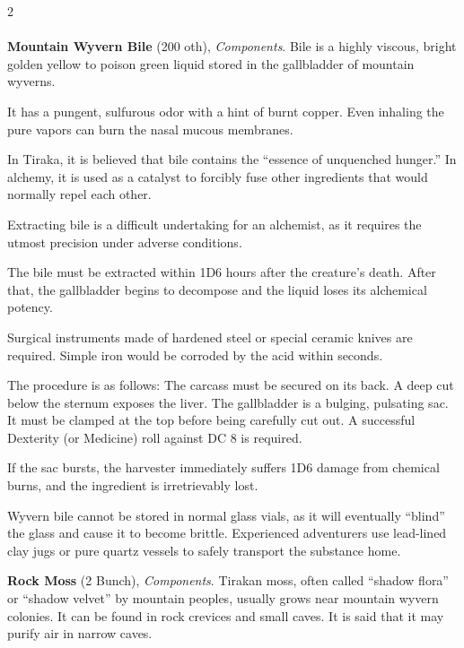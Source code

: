 \begin{multicols}{2}
    \paragraph{}
    \begin{denseitemize}
        \item \textbf{Mountain Wyvern Bile} (200 oth), \textit{Components}.
        Bile is a highly viscous, bright golden yellow to poison green liquid stored in the gallbladder of mountain wyverns.

It has a pungent, sulfurous odor with a hint of burnt copper. Even inhaling the pure vapors can burn the nasal mucous membranes.

In Tiraka, it is believed that bile contains the “essence of unquenched hunger.” In alchemy, it is used as a catalyst to forcibly fuse other ingredients that would normally repel each other.

Extracting bile is a difficult undertaking for an alchemist, as it requires the utmost precision under adverse conditions.

The bile must be extracted within 1D6 hours after the creature's death. After that, the gallbladder begins to decompose and the liquid loses its alchemical potency.

Surgical instruments made of hardened steel or special ceramic knives are required. Simple iron would be corroded by the acid within seconds.

The procedure is as follows: The carcass must be secured on its back.
A deep cut below the sternum exposes the liver.
The gallbladder is a bulging, pulsating sac. It must be clamped at the top before being carefully cut out. A successful Dexterity (or Medicine) roll against DC 8 is required.

If the sac bursts, the harvester immediately suffers 1D6 damage from chemical burns, and the ingredient is irretrievably lost. 

Wyvern bile cannot be stored in normal glass vials, as it will eventually “blind” the glass and cause it to become brittle. Experienced adventurers use lead-lined clay jugs or pure quartz vessels to safely transport the substance home.
        \item \textbf{Rock Moss} (2 Bunch), \textit{Components}.
        Tirakan moss, often called “shadow flora” or “shadow velvet” by mountain peoples, usually grows near mountain wyvern colonies. It can be found in rock crevices and small caves. It is said that it may purify air in narrow caves.


\end{denseitemize}
\end{multicols}
